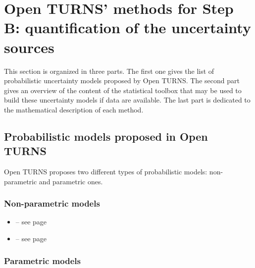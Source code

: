 \section{Open TURNS' methods for Step B: quantification of the uncertainty sources}

This section is organized in three parts. The first one gives the list of probabilistic uncertainty models proposed by Open TURNS. The second part gives an overview of the content of the statistical toolbox that may be used to build these uncertainty models if data are available. The last part is dedicated to the mathematical description of each method. \\


\subsection{Probabilistic models proposed in Open TURNS}

Open TURNS proposes two different types of probabilistic models: non-parametric and parametric ones.

\subsubsection{Non-parametric models}

\begin{itemize}

\item {} -- see page \pageref{docref_B11_EmpiricalCDF} \vspace{2mm}
\item {} -- see page \pageref{docref_B11_KernelSmoothing} \vspace{2mm}

\end{itemize}

\subsubsection{Parametric models}

